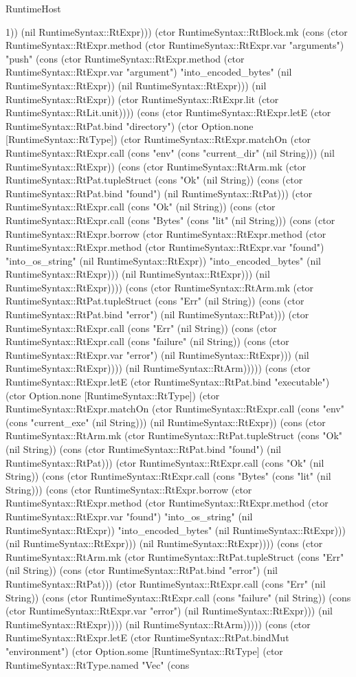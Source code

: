 \begin{lexlean}{RuntimeHost}
\begin{semanticmodule}
{1)) (nil RuntimeSyntax::RtExpr))) (ctor RuntimeSyntax::RtBlock.mk (cons (ctor RuntimeSyntax::RtExpr.method (ctor RuntimeSyntax::RtExpr.var "arguments") "push" (cons (ctor RuntimeSyntax::RtExpr.method (ctor RuntimeSyntax::RtExpr.var "argument") "into_encoded_bytes" (nil RuntimeSyntax::RtExpr)) (nil RuntimeSyntax::RtExpr))) (nil RuntimeSyntax::RtExpr)) (ctor RuntimeSyntax::RtExpr.lit (ctor RuntimeSyntax::RtLit.unit)))) (cons (ctor RuntimeSyntax::RtExpr.letE (ctor RuntimeSyntax::RtPat.bind "directory") (ctor Option.none [RuntimeSyntax::RtType]) (ctor RuntimeSyntax::RtExpr.matchOn (ctor RuntimeSyntax::RtExpr.call (cons "env" (cons "current_dir" (nil String))) (nil RuntimeSyntax::RtExpr)) (cons (ctor RuntimeSyntax::RtArm.mk (ctor RuntimeSyntax::RtPat.tupleStruct (cons "Ok" (nil String)) (cons (ctor RuntimeSyntax::RtPat.bind "found") (nil RuntimeSyntax::RtPat))) (ctor RuntimeSyntax::RtExpr.call (cons "Ok" (nil String)) (cons (ctor RuntimeSyntax::RtExpr.call (cons "Bytes" (cons "lit" (nil String))) (cons (ctor RuntimeSyntax::RtExpr.borrow (ctor RuntimeSyntax::RtExpr.method (ctor RuntimeSyntax::RtExpr.method (ctor RuntimeSyntax::RtExpr.var "found") "into_os_string" (nil RuntimeSyntax::RtExpr)) "into_encoded_bytes" (nil RuntimeSyntax::RtExpr))) (nil RuntimeSyntax::RtExpr))) (nil RuntimeSyntax::RtExpr)))) (cons (ctor RuntimeSyntax::RtArm.mk (ctor RuntimeSyntax::RtPat.tupleStruct (cons "Err" (nil String)) (cons (ctor RuntimeSyntax::RtPat.bind "error") (nil RuntimeSyntax::RtPat))) (ctor RuntimeSyntax::RtExpr.call (cons "Err" (nil String)) (cons (ctor RuntimeSyntax::RtExpr.call (cons "failure" (nil String)) (cons (ctor RuntimeSyntax::RtExpr.var "error") (nil RuntimeSyntax::RtExpr))) (nil RuntimeSyntax::RtExpr)))) (nil RuntimeSyntax::RtArm))))) (cons (ctor RuntimeSyntax::RtExpr.letE (ctor RuntimeSyntax::RtPat.bind "executable") (ctor Option.none [RuntimeSyntax::RtType]) (ctor RuntimeSyntax::RtExpr.matchOn (ctor RuntimeSyntax::RtExpr.call (cons "env" (cons "current_exe" (nil String))) (nil RuntimeSyntax::RtExpr)) (cons (ctor RuntimeSyntax::RtArm.mk (ctor RuntimeSyntax::RtPat.tupleStruct (cons "Ok" (nil String)) (cons (ctor RuntimeSyntax::RtPat.bind "found") (nil RuntimeSyntax::RtPat))) (ctor RuntimeSyntax::RtExpr.call (cons "Ok" (nil String)) (cons (ctor RuntimeSyntax::RtExpr.call (cons "Bytes" (cons "lit" (nil String))) (cons (ctor RuntimeSyntax::RtExpr.borrow (ctor RuntimeSyntax::RtExpr.method (ctor RuntimeSyntax::RtExpr.method (ctor RuntimeSyntax::RtExpr.var "found") "into_os_string" (nil RuntimeSyntax::RtExpr)) "into_encoded_bytes" (nil RuntimeSyntax::RtExpr))) (nil RuntimeSyntax::RtExpr))) (nil RuntimeSyntax::RtExpr)))) (cons (ctor RuntimeSyntax::RtArm.mk (ctor RuntimeSyntax::RtPat.tupleStruct (cons "Err" (nil String)) (cons (ctor RuntimeSyntax::RtPat.bind "error") (nil RuntimeSyntax::RtPat))) (ctor RuntimeSyntax::RtExpr.call (cons "Err" (nil String)) (cons (ctor RuntimeSyntax::RtExpr.call (cons "failure" (nil String)) (cons (ctor RuntimeSyntax::RtExpr.var "error") (nil RuntimeSyntax::RtExpr))) (nil RuntimeSyntax::RtExpr)))) (nil RuntimeSyntax::RtArm))))) (cons (ctor RuntimeSyntax::RtExpr.letE (ctor RuntimeSyntax::RtPat.bindMut "environment") (ctor Option.some [RuntimeSyntax::RtType] (ctor RuntimeSyntax::RtType.named "Vec" (cons }
\end{semanticmodule}
\end{lexlean}

